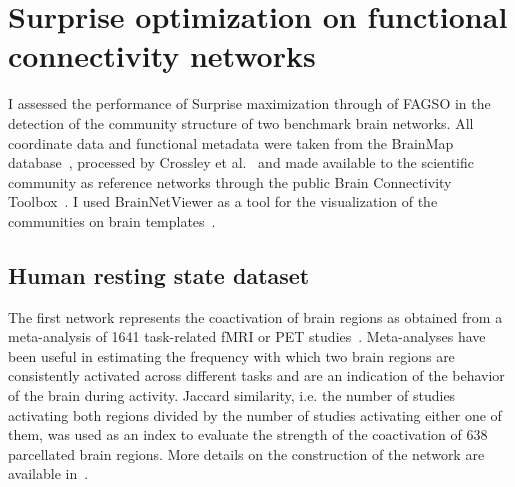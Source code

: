 \section{Surprise optimization on functional connectivity networks}
\label{sec:surprise_optimization_fc_networks}
I assessed the performance of Surprise maximization through of FAGSO in the detection of the community structure of two benchmark brain networks. All coordinate data and functional metadata were taken from the BrainMap database~\cite{fox2002,laird2005}, processed by Crossley et al.~\cite{crossley2013a} and made available to the scientific community as reference networks through the public Brain Connectivity Toolbox~\cite{rubinov2010}. I used BrainNetViewer as a tool for the visualization of the communities on brain templates~\cite{xia2013}.

\subsection{Human resting state dataset}\label{sec:restingstatedataset}
The first network represents the coactivation of brain regions as obtained from a meta-analysis of 1641 task-related fMRI or PET studies~\cite{crossley2013a}.
Meta-analyses have been useful in estimating the frequency with which two brain regions are consistently activated across different tasks and are an indication of the behavior of the brain during activity.
Jaccard similarity, i.e. the number of studies activating both regions divided by the number of studies activating either one of them, was used as an index to evaluate the strength of the coactivation of 638 parcellated brain regions. More details on the construction of the network are available in~\cite{crossley2013a}.

